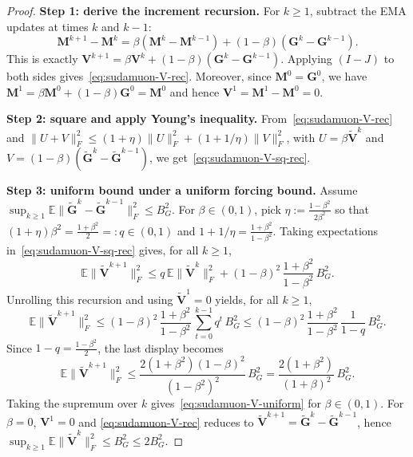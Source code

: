 \documentclass{article}
\begin{document}
\begin{proof}
\medskip\noindent\textbf{Step 1: derive the increment recursion.}
For $k\ge 1$, subtract the EMA updates at times $k$ and $k-1$:
\[
\mathbf M^{k+1}-\mathbf M^{k}
= \beta(\mathbf M^{k}-\mathbf M^{k-1}) + (1-\beta)(\mathbf G^{k}-\mathbf G^{k-1}).
\]
This is exactly $\mathbf V^{k+1}=\beta\mathbf V^k+(1-\beta)(\mathbf G^k-\mathbf G^{k-1})$.
Applying $(I-J)$ to both sides gives~\eqref{eq:sudamuon-V-rec}.
Moreover, since $\mathbf M^0=\mathbf G^0$, we have $\mathbf M^1=\beta\mathbf M^0+(1-\beta)\mathbf G^0=\mathbf M^0$ and hence $\mathbf V^1=\mathbf M^1-\mathbf M^0=0$.

\medskip\noindent\textbf{Step 2: square and apply Young's inequality.}
From~\eqref{eq:sudamuon-V-rec} and $\|U+V\|_F^2\le (1+\eta)\|U\|_F^2+(1+1/\eta)\|V\|_F^2$,
with $U=\beta\tilde{\mathbf V}^k$ and $V=(1-\beta)(\tilde{\mathbf G}^{k}-\tilde{\mathbf G}^{k-1})$, we get~\eqref{eq:sudamuon-V-sq-rec}.

\medskip\noindent\textbf{Step 3: uniform bound under a uniform forcing bound.}
Assume $\sup_{k\ge 1}\mathbb{E}\|\tilde{\mathbf G}^{k}-\tilde{\mathbf G}^{k-1}\|_F^2\le B_G^2$.
For $\beta\in(0,1)$, pick $\eta:=\tfrac{1-\beta^2}{2\beta^2}$ so that $(1+\eta)\beta^2=\tfrac{1+\beta^2}{2}=:q\in(0,1)$ and $1+1/\eta=\tfrac{1+\beta^2}{1-\beta^2}$.
Taking expectations in~\eqref{eq:sudamuon-V-sq-rec} gives, for all $k\ge 1$,
\[
\mathbb{E}\|\tilde{\mathbf V}^{k+1}\|_F^2
\le q\,\mathbb{E}\|\tilde{\mathbf V}^{k}\|_F^2 + (1-\beta)^2\,\frac{1+\beta^2}{1-\beta^2}\,B_G^2.
\]
Unrolling this recursion and using $\tilde{\mathbf V}^1=0$ yields, for all $k\ge 1$,
\[
\mathbb{E}\|\tilde{\mathbf V}^{k+1}\|_F^2
\le (1-\beta)^2\,\frac{1+\beta^2}{1-\beta^2}\,\sum_{t=0}^{k-1} q^{t}\,B_G^2
\le (1-\beta)^2\,\frac{1+\beta^2}{1-\beta^2}\,\frac{1}{1-q}\,B_G^2.
\]
Since $1-q=\tfrac{1-\beta^2}{2}$, the last display becomes
\[
\mathbb{E}\|\tilde{\mathbf V}^{k+1}\|_F^2
\le \frac{2(1+\beta^2)(1-\beta)^2}{(1-\beta^2)^2}\,B_G^2
= \frac{2(1+\beta^2)}{(1+\beta)^2}\,B_G^2.
\]
Taking the supremum over $k$ gives~\eqref{eq:sudamuon-V-uniform} for $\beta\in(0,1)$.
For $\beta=0$, $\mathbf V^1=0$ and \eqref{eq:sudamuon-V-rec} reduces to $\tilde{\mathbf V}^{k+1}=\tilde{\mathbf G}^{k}-\tilde{\mathbf G}^{k-1}$, hence
$\sup_{k\ge 1}\mathbb{E}\|\tilde{\mathbf V}^{k}\|_F^2\le B_G^2\le 2B_G^2$.
\end{proof}
\end{document}
